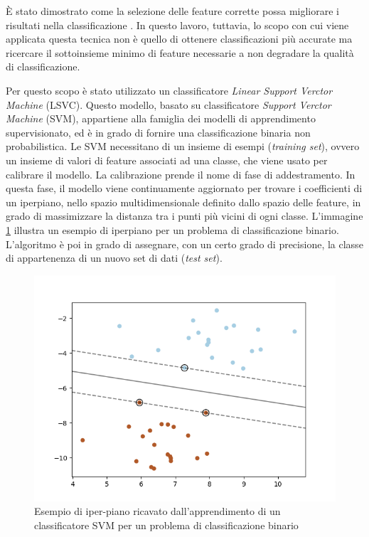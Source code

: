 \uppercase{è} stato dimostrato come la selezione delle feature corrette possa migliorare i risultati nella classificazione \cite{guyon2002gene}. In questo lavoro, tuttavia, lo scopo con cui viene applicata questa tecnica non è quello di ottenere classificazioni più accurate ma ricercare il sottoinsieme minimo di feature necessarie a non degradare la qualità di classificazione.

Per questo scopo è stato utilizzato un classificatore \emph{Linear Support Verctor Machine} (LSVC). Questo modello, basato su classificatore \emph{Support Verctor Machine} (SVM), appartiene alla famiglia dei modelli di apprendimento supervisionato, ed è in grado di fornire una classificazione binaria non probabilistica. Le SVM necessitano di un insieme di esempi (\emph{training set}), ovvero un insieme di valori di feature associati ad una classe, che viene usato per calibrare il modello. La calibrazione prende il nome di fase di addestramento. In questa fase, il modello viene continuamente aggiornato per trovare i coefficienti di un iperpiano, nello spazio multidimensionale definito dallo spazio delle feature, in grado di massimizzare la distanza tra i punti più vicini di ogni classe. L'immagine \ref{img:svm_hyperplane} illustra un esempio di iperpiano per un problema di classificazione binario. L'algoritmo è poi in grado di assegnare, con un certo grado di precisione, la classe di appartenenza di un nuovo set di dati (\emph{test set}).

\begin{figure}[t]
\centering
\includegraphics[width=.65\textwidth]{img/svm_hyperplane.png}
\caption{Esempio di iper-piano ricavato dall'apprendimento di un classificatore SVM per un problema di classificazione binario}
\label{img:svm_hyperplane}
\end{figure}

